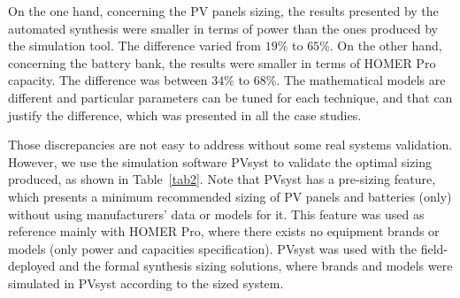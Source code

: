 \documentclass[runningheads]{llncs}
\begin{document}
On the one hand, concerning the PV panels sizing, the results presented by the automated synthesis were smaller in terms of power than the ones produced by the simulation tool. The difference varied from $19$\% to $65$\%. On the other hand, concerning the battery bank, the results were smaller in terms of HOMER Pro capacity. The difference was between $34$\% to $68$\%. The mathematical models are different and particular parameters can be tuned for each technique, and that can justify the difference, which was presented in all the case studies.

Those discrepancies are not easy to address without some real systems validation. However, we use the simulation software PVsyst to validate the optimal sizing produced, as shown in Table~\ref{tab2}. Note that PVsyst has a pre-sizing feature, which presents a minimum recommended sizing of PV panels and batteries (only) without using manufacturers' data or models for it. This feature was used as reference mainly with HOMER Pro, where there exists no equipment brands or models (only power and capacities specification). PVsyst was used with the field-deployed and the formal synthesis sizing solutions, where brands and models were simulated in PVsyst according to the sized system.
%
\end{document}
